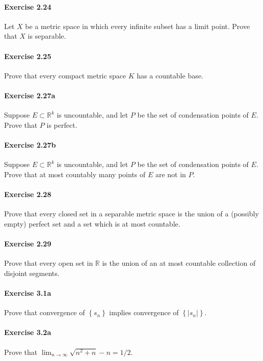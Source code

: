 \documentclass{article}
\begin{document}
\paragraph{Exercise 2.24} Let $X$ be a metric space in which every infinite subset has a limit point. Prove that $X$ is separable.

\paragraph{Exercise 2.25} Prove that every compact metric space $K$ has a countable base.

\paragraph{Exercise 2.27a} Suppose $E\subset\mathbb{R}^k$ is uncountable, and let $P$ be the set of condensation points of $E$. Prove that $P$ is perfect.

\paragraph{Exercise 2.27b} Suppose $E\subset\mathbb{R}^k$ is uncountable, and let $P$ be the set of condensation points of $E$. Prove that at most countably many points of $E$ are not in $P$.

\paragraph{Exercise 2.28} Prove that every closed set in a separable metric space is the union of a (possibly empty) perfect set and a set which is at most countable.

\paragraph{Exercise 2.29} Prove that every open set in $\mathbb{R}$ is the union of an at most countable collection of disjoint segments.

\paragraph{Exercise 3.1a} Prove that convergence of $\left\{s_{n}\right\}$ implies convergence of $\left\{\left|s_{n}\right|\right\}$.

\paragraph{Exercise 3.2a} Prove that $\lim_{n \rightarrow \infty}\sqrt{n^2 + n} -n = 1/2$.
\end{document}

